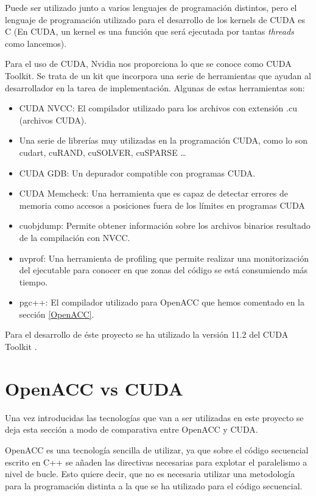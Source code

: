 Puede ser utilizado junto a varios lenguajes de programación distintos, pero el lenguaje de programación utilizado para el desarrollo de los kernels de CUDA es C (En CUDA, un kernel es una función que será ejecutada por tantas \textit{threads} como lancemos).

Para el uso de CUDA, Nvidia nos proporciona lo que se conoce como CUDA Toolkit. Se trata de un kit que incorpora una serie de herramientas que ayudan al desarrollador en la tarea de implementación. Algunas de estas herramientas son:

\begin{itemize}
    \item CUDA NVCC: El compilador utilizado para los archivos con extensión .cu (archivos CUDA).
    \item Una serie de librerías muy utilizadas en la programación CUDA, como lo son cudart, cuRAND, cuSOLVER, cuSPARSE \dots
    \item CUDA GDB: Un depurador compatible con programas CUDA.
    \item CUDA Memcheck: Una herramienta que es capaz de detectar errores de memoria como accesos a posiciones fuera de los límites en programas CUDA
    \item cuobjdump: Permite obtener información sobre los archivos binarios resultado de la compilación con NVCC.
    \item nvprof: Una herramienta de profiling que permite realizar una monitorización del ejecutable para conocer en que zonas del código se está consumiendo más tiempo.
    \item pgc++: El compilador utilizado para OpenACC que hemos comentado en la sección \ref{OpenACC}.
\end{itemize}

Para el desarrollo de éste proyecto se ha utilizado la versión 11.2 del CUDA Toolkit \cite{unknown-author-2021F}.

\section{OpenACC vs CUDA}
\label{comparativa}

Una vez introducidas las tecnologías que van a ser utilizadas en este proyecto se deja esta sección a modo de comparativa entre OpenACC y CUDA.

OpenACC es una tecnología sencilla de utilizar, ya que sobre el código secuencial escrito en C++ se añaden las directivas necesarias para explotar el paralelismo a nivel de bucle. Esto quiere decir, que no es necesaria utilizar una metodología para la programación distinta a la que se ha utilizado para el código secuencial.

